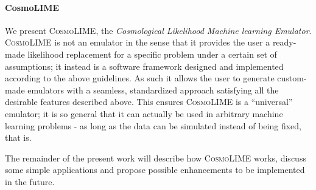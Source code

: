\paragraph{CosmoLIME}
We present \textsc{CosmoLIME}, the \textit{Cosmological Likelihood Machine learning Emulator}. \textsc{CosmoLIME} is not an emulator in the sense that it provides the user a ready-made likelihood replacement for a specific problem under a certain set of assumptions; it instead is a software framework designed and implemented according to the above guidelines. As such it allows the user to generate custom-made emulators with a seamless, standardized approach satisfying all the desirable features described above. This ensures \textsc{CosmoLIME} is a ``universal'' emulator; it is so general that it can actually be used in arbitrary machine learning problems - as long as the data can be simulated instead of being fixed, that is.

The remainder of the present work will describe how \textsc{CosmoLIME} works, discuss some simple applications and propose possible enhancements to be implemented in the future.